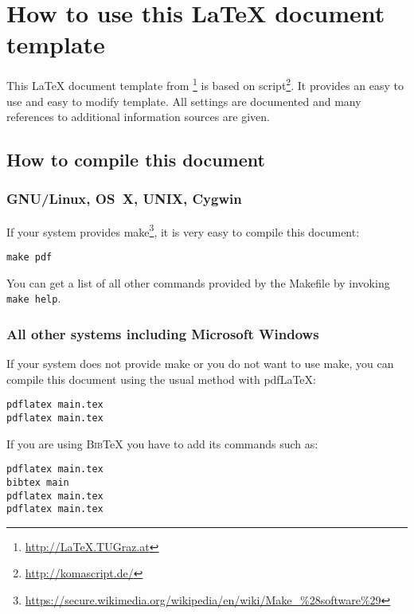 
\section{How to use this \LaTeX{} document template}

This \LaTeX{} document template from
\vkLaT\footnote{\url{http://LaTeX.TUGraz.at}} is based on 
script\footnote{\url{http://komascript.de/}}. It provides an easy to use and
easy to modify template. All settings are documented and many references to
additional information sources are given.

\subsection{How to compile this document}

\subsubsection{\textsc{GNU}/Linux, \textsc{OS~X}, \textsc{UNIX}, Cygwin}

If your system provides 
make\footnote{\url{https://secure.wikimedia.org/wikipedia/en/wiki/Make\_\%28software\%29}},
it is very easy to compile this document:

\begin{verbatim}
make pdf
\end{verbatim}

You can get a list of all other commands provided by the Makefile by invoking
\texttt{make help}.

\subsubsection{All other systems including Microsoft Windows}

If your system does not provide  make or you do not want to use  make,
you can compile this document using the usual method with pdf\LaTeX{}:

\begin{verbatim}
pdflatex main.tex
pdflatex main.tex
\end{verbatim}

If you are using \textsc{Bib}\TeX{} you have to add its commands such as:

\begin{verbatim}
pdflatex main.tex
bibtex main
pdflatex main.tex
pdflatex main.tex
\end{verbatim}

